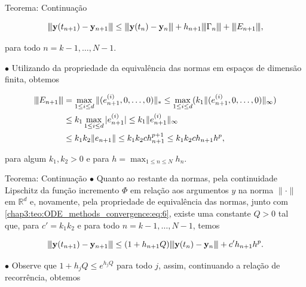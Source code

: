 \documentclass{beamer}
\newcommand{\vertiii}[1]{{\left\vert\kern-0.25ex\left\vert\kern-0.25ex\left\vert #1 
    \right\vert\kern-0.25ex\right\vert\kern-0.25ex\right\vert}}
\theoremstyle{plain}
\theoremstyle{definition}
\begin{document}

\begin{frame}{Teorema: Continuação}

    \small

    \[
      \vertiii{\mathbf{y}(t_{n+1})-\mathbf{y}_{n+1}} \leq \vertiii{\mathbf{y}(t_{n})-\mathbf{y}_{n}}+h_{n+1} \vertiii{\Gamma _ { n }} + \vertiii{E_{n+1} },
    \]

    \noindent
    para todo \(n=k-1, \ldots, N-1\).

    \phantom{aa} $\bullet$ Utilizando da propriedade da equivalência das normas em espaços de dimensão finita, obtemos 

    \[
      \begin{aligned}
        \vertiii{E_{n+1}} &= \max_{1 \leq i \leq d} \| (e_{n+1}^{(i)}, 0, \dots, 0) \|_* \leq 
        \max_{1 \leq i \leq d} ( k_1 \| (e_{n+1}^{(i)}, 0, \dots, 0) \|_\infty ) \\
                          &\leq k_1 \max_{1 \leq i \leq d} |e_{n+1}^{(i)}| 
        \leq k_1 \|e_{n+1}^{(i)}\|_\infty  \\
                          &\leq k_1 k_2 \|e_{n+1}\| \leq k_1 k_2 c h_{n+1}^{p+1} \leq k_1 k_2 c h_{n+1} h^{p},
      \end{aligned}
    \]

    \noindent
    para algum $k_1, k_2 > 0$ e para $h = \max_{1 \leq n \leq N} h_n$.
\end{frame}


\begin{frame}{Teorema: Continuação}
    \phantom{aa} $\bullet$ Quanto ao restante da normas, pela continuidade Lipschitz da função incremento \(\Phi\) em relação aos argumentos \(y\) na norma \(\|\cdot\|\) em \(\mathbb{R}^{d}\) e, novamente, pela propriedade de equivalência das normas, junto com \eqref{chap3:teo:ODE_methods_convergence:eq:6}, existe uma constante \(Q>0\) tal que, para $c' = k_1 k_2$ e para todo $n = k - 1, \dots, N -1$, temos

    \[
      \vertiii{\mathbf{y}(t_{n+1})-\mathbf{y}_{n+1}} \leq (1+h_{n+1} Q) \vertiii{\mathbf{y}(t_{n})-\mathbf{y}_{n}} 
      +c^{\prime} h_{n+1} h^{p}.
    \]

    \phantom{aa} $\bullet$ Observe que $1 + h_j Q \leq e^{h_j Q}$ para todo $j$, assim, continuando a relação de recorrência, obtemos

\end{frame}
\end{document}
